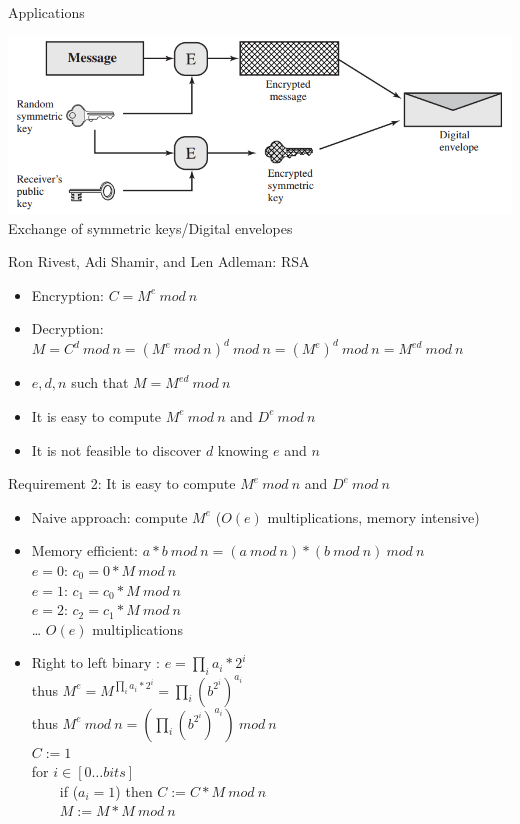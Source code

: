 \documentclass{beamer}
\begin{document}
\begin{frame}{Applications}
  \begin{center}
    \includegraphics[width=0.8\linewidth]{envelope}\\
  Exchange of symmetric keys/Digital envelopes
  \end{center}
\end{frame}


\begin{frame}{ Ron Rivest, Adi Shamir, and Len Adleman: RSA }
  \begin{itemize}
    \item Encryption: $C = M^e\ mod\ n$
    \item Decryption: $M = C^d\ mod\ n = (M^e\ mod\ n)^d\ mod\ n = (M^e)^d\ mod\ n = M^{ed}\ mod\ n$
    \item $e,d,n$ such that $M = M^{ed}\ mod\ n$
    \item It is easy to compute $M^e\ mod\ n$ and $D^e\ mod\ n$
    \item It is not feasible to discover $d$ knowing $e$ and $n$
  \end{itemize}
\end{frame}

\begin{frame}{Requirement 2: It is easy to compute $M^e\ mod\ n$ and $D^e\ mod\ n$}
  \begin{itemize}
    \item Naive approach: compute $M^e$ ($O(e)$ multiplications, memory intensive)
    \item<2-> Memory efficient: $a*b\ mod\ n = (a\ mod\ n)*(b\ mod\ n)\ mod\ n$\\ 
      $e=0$: $c_0 = 0 * M\ mod\ n$\\
      $e=1$: $c_1 = c_0 * M\ mod\ n$\\
      $e=2$: $c_2 = c_1 * M\ mod\ n$\\
      \dots
      $O(e)$ multiplications
    \item<3-> Right to left binary : $e = \prod_i a_i*2^i$\\ 
      thus $M^e = M^{\prod_i a_i*2^i} = \prod_i (b^{2^i})^{a_i}$\\
      thus $M^e\ mod\ n = (\prod_i (b^{2^i})^{a_i})\ mod\ n$\\
      $C:=1$\\
      for $i \in [0\dots bits]$\\
      \ \ \ \  if ($a_i=1$) then $C:= C * M\ mod\ n$\\
      \ \ \ \  $M:= M*M\ mod\ n$
  \end{itemize}
\end{frame}
\end{document}
